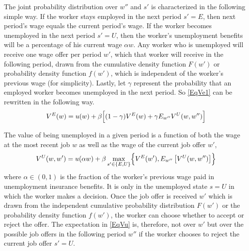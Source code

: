 The joint probability distribution over $w''$ and $s'$ is characterized in the following simple way. If the worker stays employed in the next period $s' = E$, then next period's wage equals the current period's wage. If the worker becomes unemployed in the next period $s' = U$, then the worker's unemployment benefits will be a percentage of his current wage $\alpha w$. Any worker who is unemployed will receive one wage offer per period $w'$, which that worker will receive in the following period, drawn from the cumulative density function $F(w')$ or probability density function $f(w')$, which is independent of the worker's previous wage (for simplicity). Lastly, let $\gamma$ represent the probability that an employed worker becomes unemployed in the next period. So \eqref{EqVe1} can be rewritten in the following way.
\begin{equation}\label{EqVe2}
   V^E(w) = u(w) + \beta \Bigl[(1-\gamma)V^E(w) + \gamma E_{w''}V^U(w,w'')\Bigr]
\end{equation}

The value of being unemployed in a given period is a function of both the wage at the most recent job $w$ as well as the wage of the current job offer $w'$,
\begin{equation}\label{EqVu}
   V^U(w,w') = u(\alpha w) + \beta\max_{s'\in\{E,U\}}\Bigl\{V^E(w'),E_{w''}\left[V^U(w,w'')\right]\Bigr\}
\end{equation}
where $\alpha\in(0,1)$ is the fraction of the worker's previous wage paid in unemployment insurance benefits. It is only in the unemployed state $s=U$ in which the worker makes a decision. Once the job offer is received $w'$ which is drawn from the independent cumulative probability distribution $F(w')$ or the probability density function $f(w')$, the worker can choose whether to accept or reject the offer. The expectation in \eqref{EqVu} is, therefore, not over $w'$ but over the possible job offers in the following period $w''$ if the worker chooses to reject the current job offer $s' = U$.

